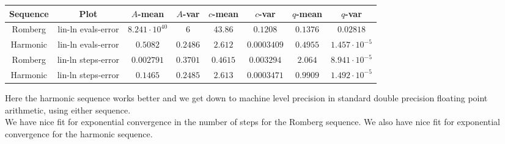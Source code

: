 \begin{table}[H]
    \centering
    \small
     \begin{tabular}{c|c||c|c|c|c|c|c}
Sequence & Plot & \(A\)-mean & \(A\)-var & \(c\)-mean & \(c\)-var & \(q\)-mean & \(q\)-var\\\hline
\rowcolor{red}
Romberg & lin-ln evals-error & \(8.241\cdot 10^{40}\) & \(6\) & \(43.86\) & \(0.1208\) & \(0.1376\) & \(0.02818\) \\
\rowcolor{green}
Harmonic & lin-ln evals-error & \(0.5082\) & \(0.2486\) & \(2.612\) & \(0.0003409\) & \(0.4955\) & \(1.457\cdot 10^{-5}\) \\
\rowcolor{green}
Romberg & lin-ln steps-error & \(0.002791\) & \(0.3701\) & \(0.4615\) & \(0.003294\) & \(2.064\) & \(8.941\cdot 10^{-5}\) \\
\rowcolor{green}
Harmonic & lin-ln steps-error & \(0.1465\) & \(0.2485\) & \(2.613\) & \(0.0003471\) & \(0.9909\) & \(1.492\cdot 10^{-5}\) \\
    \end{tabular}
    \label{tab:my_label}
\end{table}

Here the harmonic sequence works better and we get down to machine level precision in standard double precision floating point arithmetic, using either sequence.\\

We have nice fit for exponential convergence in the number of steps for the Romberg sequence. We also have nice fit for exponential convergence for the harmonic sequence.

